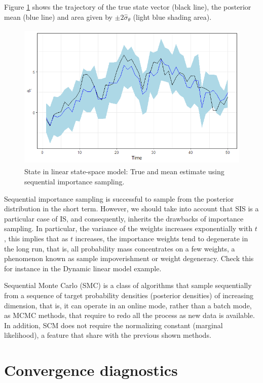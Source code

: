 Figure \ref{fig58} shows the trajectory of the true state vector (black line), the posterior mean (blue line) and area given by $\pm2\hat{\sigma}_{\theta}$ (light blue shading area).

\begin{figure}[!h]
	\includegraphics[width=340pt, height=200pt]{Chapters/chapter5/figures/SIS.png}
	\caption[List of figure caption goes here]{State in linear state-space model: True and mean estimate using sequential importance sampling.}\label{fig58}
\end{figure} 

Sequential importance sampling is successful to sample from the posterior distribution in the short term. However, we should take into account that SIS is a particular case of IS, and consequently, inherits the drawbacks of importance sampling. In particular, the variance of the weights increases exponentially with $t$ \cite{kong1994sequential}, this implies that as $t$ increases, the importance weights tend to degenerate in the long run, that is, all probability mass concentrates on a few weights, a phenomenon known as sample impoverishment or weight degeneracy. Check this for instance in the Dynamic linear model example.

 


Sequential Monte Carlo (SMC) is a class of algorithms that sample sequentially from a sequence of target probability densities (posterior densities) of increasing dimension, that is, it can operate in an online mode, rather than a batch mode, as MCMC methods, that require to redo all the process as new data is available. In addition, SCM does not require the normalizing constant (marginal likelihood), a feature that share with the previous shown methods.

 

\section{Convergence diagnostics}\label{sec54}

